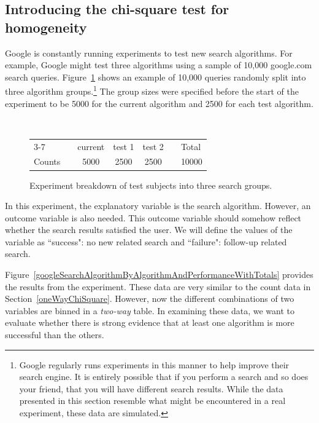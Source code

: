 \subsection{Introducing the chi-square test for homogeneity}
Google is constantly running experiments to test new search algorithms. For example, Google might test three algorithms using a sample of 10,000 google.com search queries. Figure~\ref{googleSearchAlgorithmByAlgorithmOnly} shows an example of 10,000 queries randomly split into three algorithm groups.\footnote{Google regularly runs experiments in this manner to help improve their search engine. It is entirely possible that if you perform a search and so does your friend, that you will have different search results. While the data presented in this section resemble what might be encountered in a real experiment, these data are simulated.} The group sizes were specified before the start of the experiment to be 5000 for the current algorithm and 2500 for each test algorithm.

\begin{figure}[h]
\centering
\quad \quad \quad \quad {} \\
\begin{tabular}{ll ccc ll}
\cline{3-7}
	 & \hspace{1mm} & current & test 1 & test 2 & \hspace{1mm} & Total \\
Counts &		& 5000 & 2500 & 2500 & & 10000 \\
\hline
\end{tabular}
\caption{Experiment breakdown of test subjects into three search groups.}
\label{googleSearchAlgorithmByAlgorithmOnly}
\end{figure}


In this experiment, the explanatory variable is the search algorithm. However, an outcome variable is also needed. This outcome variable should somehow reflect whether the search results satisfied the user.  We will define the values of the  variable as ``success": no new related search and ``failure": follow-up related search.  

Figure~\ref{googleSearchAlgorithmByAlgorithmAndPerformanceWithTotals} provides the results from the experiment. These data are very similar to the count data in Section~\ref{oneWayChiSquare}. However, now the different combinations of two variables are binned in a \emph{two-way} table. In examining these data, we want to evaluate whether there is strong evidence that at least one algorithm is more successful than the others. 

